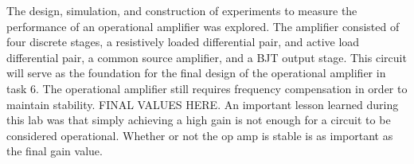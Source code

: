 

The design, simulation, and construction of experiments to measure the performance of an operational amplifier was explored. The amplifier consisted of four discrete stages, a resistively loaded differential pair, and active load differential pair, a common source amplifier, and a BJT output stage. This circuit will serve as the foundation for the final design of the operational amplifier in task 6. The operational amplifier still requires frequency compensation in order to maintain stability. FINAL VALUES HERE. An important lesson learned during this lab was that simply achieving a high gain is not enough for a circuit to be considered operational. Whether or not the op amp is stable is as important as the final gain value.
